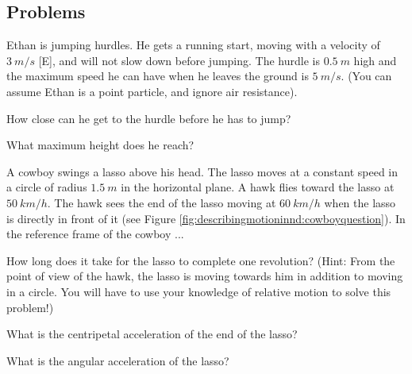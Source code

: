 \subsection{Problems}
\begin{problemParts}{Ethan is jumping hurdles. He gets a running start, moving with a velocity of $\SI{3}{m/s}$ [E], and will not slow down before jumping. The hurdle is $\SI{0.5}{m}$ high and the maximum speed he can have when he leaves the ground is $\SI{5}{m/s}$. (You can assume Ethan is a point particle, and ignore air resistance).\label{prob:describingmotioninnd:hurdles}}
\item How close can he get to the hurdle before he has to jump?
\item What maximum height does he reach?
\end{problemParts}

\begin{problemParts}{A cowboy swings a lasso above his head. The lasso moves at a constant speed in a circle of radius $\SI{1.5}{m}$ in the horizontal plane. A hawk flies toward the lasso at $\SI{50}{km/h}$. The hawk sees the end of the lasso moving at $\SI{60}{km/h}$ when the lasso is directly in front of it (see Figure \ref{fig:describingmotioninnd:cowboyquestion}). 
In the reference frame of the cowboy ...\label{prob:describingmotioninnd:cowboy}}
\item How long does it take for the lasso to complete one revolution? (Hint: From the point of view of the hawk, the lasso is moving towards him in addition to moving in a circle. You will have to use your knowledge of relative motion to solve this problem!)
\item What is the centripetal acceleration of the end of the lasso? 
\item What is the angular acceleration of the lasso?
\end{problemParts} 

\newpage
